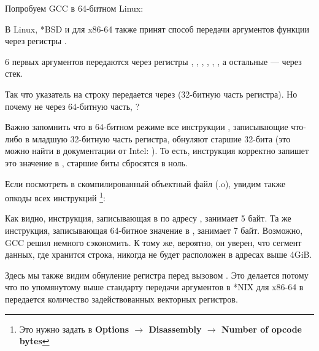 
Попробуем GCC в 64-битном Linux:



В Linux, *BSD и \MacOSX для x86-64 также принят способ передачи аргументов функции через регистры \SysVABI.

6 первых аргументов передаются через регистры \RDI, \RSI, \RDX, \RCX, , , а остальные --- через стек.

Так что указатель на строку передается через \EDI (32-битную часть регистра).
Но почему не через 64-битную часть, \RDI?

Важно запомнить что в 64-битном режиме все инструкции \MOV, записывающие что-либо в младшую 32-битную часть регистра, обнуляют старшие 32-бита (это можно найти в документации от Intel: ).
То есть, инструкция  корректно запишет это значение в \RAX, старшие биты сбросятся в ноль.

Если посмотреть в \IDA скомпилированный объектный файл (.o), увидим также опкоды всех инструкций
\footnote{Это нужно задать в \textbf{Options $\rightarrow$ Disassembly $\rightarrow$ Number of opcode bytes}}:



\label{hw_EDI_instead_of_RDI}
Как видно, инструкция, записывающая в \EDI по адресу , занимает 5 байт.
Та же инструкция, записывающая 64-битное значение в \RDI, занимает 7 байт.
Возможно, GCC решил немного сэкономить.
К тому же, вероятно, он уверен, что сегмент данных, где хранится строка, никогда не будет расположен в адресах выше 4\gls{GiB}.

\label{SysVABI_input_EAX}
Здесь мы также видим обнуление регистра \EAX перед вызовом \printf.
Это делается потому что по упомянутому выше стандарту передачи аргументов в *NIX для x86-64 в \EAX передается количество задействованных векторных регистров.

